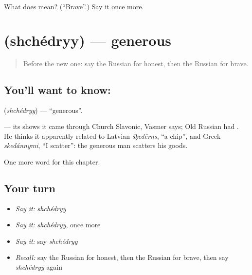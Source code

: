 \begin{tcolorbox}[breakable,colback=teal!4,colframe=teal!35!black,title={Before you move on}]
What does  mean? (\textquotedblleft{}Brave\textquotedblright{}.) Say it once more.
\end{tcolorbox}
\section[\texorpdfstring{\ru{щедрый} (shchédryy)}{щедрый (shchédryy)}]{ (shchédryy) — generous}

\label{lesson:RU-C186-shchedryy}



\begin{quote}
Before the new one: say the Russian for honest, then the Russian for brave.
\end{quote}

\subsection*{You'll want to know: }
\textbf{} (\emph{shchédryy}) — \textquotedblleft{}generous\textquotedblright{}.

\begin{cousinweb}
\textbf{} — its \emph{} shows it came through Church Slavonic, Vasmer says; Old Russian had \emph{}. He thinks it apparently related to Latvian \emph{šķedērns}, \textquotedblleft{}a chip\textquotedblright{}, and Greek \emph{skedánnymi}, \textquotedblleft{}I scatter\textquotedblright{}: the generous man scatters his goods.
\end{cousinweb}

\begin{grammarlens}[title={What you've built}]
One more word for this chapter.
\end{grammarlens}

\subsection*{Your turn}
\begin{itemize}
\raggedright
  \item \emph{Say it:} \emph{shchédryy}
  \item \emph{Say it:} \emph{shchédryy}, once more
  \item \emph{Say it:} say \emph{shchédryy}
  \item \emph{Recall:} say the Russian for honest, then the Russian for brave, then say \emph{shchédryy} again
\end{itemize}

